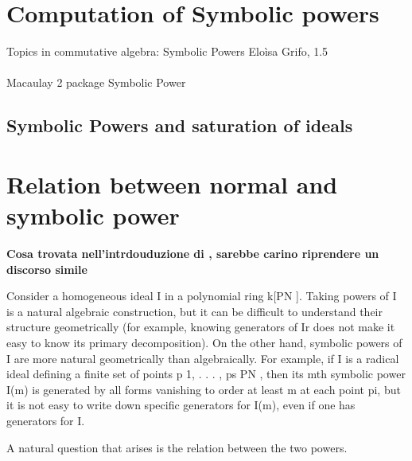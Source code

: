 \documentclass[]{book}
\theoremstyle{plain}
\theoremstyle{remark}
\theoremstyle{definition}
\begin{document}
\section{Computation of Symbolic powers}

\begin{tcolorbox}
Topics in commutative algebra:
Symbolic Powers
Eloìsa Grifo, 1.5 \\
\\
Macaulay 2 package Symbolic Power
\end{tcolorbox}

\subsection{Symbolic Powers and saturation of ideals}


\section{Relation between normal and symbolic power}
\begin{tboxprop}

\textbf{Cosa trovata nell'intrdouduzione di \cite{BocciHrabourne10} , sarebbe carino riprendere un discorso simile}

Consider a homogeneous ideal I in a polynomial ring k[PN ]. Taking powers of I is a natural algebraic construction, but it can be difficult to understand their structure geometrically (for example, knowing generators of Ir does not make it easy to know its primary decomposition). On the other hand, symbolic powers of I are more natural geometrically than algebraically. For example, if I is a radical ideal defining a finite set of points p 1, . . . , ps  PN , then its mth symbolic power I(m) is generated by all forms vanishing to order at least m at each point pi, but it is not easy to write down specific generators for I(m), even if one has generators for I.

A natural question that arises is the relation between the two powers.
\end{tboxprop}
\end{document}
